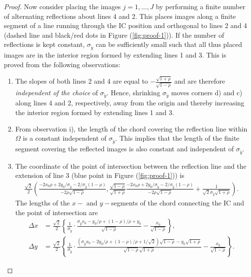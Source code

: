 \begin{proof}
  Now consider placing the images $j = 1, \ldots, J$ by performing a
  finite number of alternating reflections about lines 4 and 2. This
  places images along a finite segment of a line running through the
  IC position and orthogonal to lines 2 and 4 (dashed line and
  black/red dots in Figure (\ref{fig:proof-1})). If the number of
  reflections is kept constant, $\sigma_{\tilde{y}}$ can be sufficiently
  small such that all thus placed images are in the interior region
  formed by extending lines 1 and 3. This is proved from the following
  observations:
  \begin{enumerate}
  \item The slopes of both lines 2 and 4 are equal to
    $-\frac{\sqrt{1+\rho}}{\sqrt{1-\rho}}$ and are therefore
    \textit{independent of the choice} of $\sigma_{\tilde{y}}$. Hence,
    shrinking $\sigma_{\tilde{y}}$ moves corners d) and c) along lines 4
    and 2, respectively, away from the origin and thereby increasing
    the interior region formed by extending lines 1 and 3.
  \item From observation i), the length of the chord covering the
    reflection line within $\Omega$ is a constant independent of
    $\sigma_{\tilde{y}}$.  This implies that the length of the finite
    segment covering the reflected images is also constant and
    independent of $\sigma_{\tilde{y}}$.
  \item The coordinate of the point of intersection between the
    reflection line and the extension of line 3 (blue point in Figure
    (\ref{fig:proof-1})) is
    \begin{align*}
      \frac{\sqrt{2}}{2} \left( \frac{-2 x_0\rho + 2
      y_0/\sigma_{\tilde{y}} -
      2/\sigma_{\tilde{y}}(1-\rho)}{-2\rho\sqrt{1-\rho}},
      \frac{\sqrt{1-\rho}}{\sqrt{1+\rho}}\frac{-2 x_0\rho + 2
      y_0/\sigma_{\tilde{y}} -
      2/\sigma_{\tilde{y}}(1-\rho)}{-2\rho\sqrt{1-\rho}} +
      \frac{1}{\sqrt{2}\sigma_{\tilde{y}}\sqrt{1+\rho}} \right).
    \end{align*}
    The lengths of the $x-$ and $y-$segments of the chord connecting
    the IC and the point of intersection are
    \begin{align*}
      \Delta x &= \frac{\sqrt{2}}{2}\left\{ \frac{1}{\sigma_{\tilde{y}}}\cdot\frac{\sigma_{\tilde{y}}x_0 - y_0/\rho + (1-\rho)/\rho + y_0}{\sqrt{1-\rho}} - \frac{x_0}{\sqrt{1-\rho}} \right\},\\
      \Delta y &= \frac{\sqrt{2}}{2} \left\{ \frac{1}{\sigma_{\tilde{y}}}\cdot\frac{(\sigma_{\tilde{y}}x_0 - 2y_0/\rho + (1-\rho)/\rho + 1/\sqrt{2})\sqrt{1-\rho} - y_0\sqrt{1+\rho}}{\sqrt{1-\rho}\sqrt{1+\rho}}- \frac{x_0}{\sqrt{1-\rho}} \right\}.

\end{align*}
\end{enumerate}
\end{proof}
